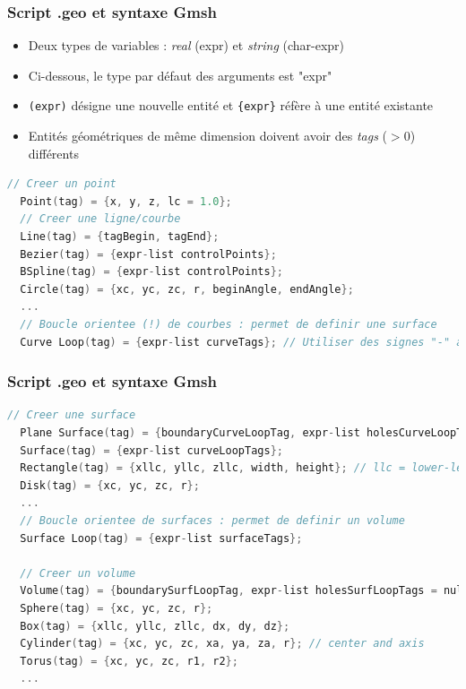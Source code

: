 \documentclass[aspectratio=169]{beamer}
\begin{document}
\begin{frame}[fragile]
\frametitle{Script .geo et syntaxe Gmsh}
\begin{itemize}
  \item Deux types de variables : \textit{real} (expr) et \textit{string} (char-expr)
  \item Ci-dessous, le type par défaut des arguments est "expr"
  \item \texttt{(expr)} désigne une nouvelle entité et \texttt{\{expr\}} réfère à une entité existante
  \item Entités géométriques de même dimension doivent avoir des \textit{tags} ($>0$) différents
\end{itemize}
\begin{lstlisting}[language=c++]
  // Creer un point
  Point(tag) = {x, y, z, lc = 1.0};
  // Creer une ligne/courbe
  Line(tag) = {tagBegin, tagEnd};
  Bezier(tag) = {expr-list controlPoints};
  BSpline(tag) = {expr-list controlPoints};
  Circle(tag) = {xc, yc, zc, r, beginAngle, endAngle};
  ...
  // Boucle orientee (!) de courbes : permet de definir une surface
  Curve Loop(tag) = {expr-list curveTags}; // Utiliser des signes "-" au besoin
\end{lstlisting}
\end{frame}

\begin{frame}[fragile]
\frametitle{Script .geo et syntaxe Gmsh}
\begin{lstlisting}[language=c++]
  // Creer une surface
  Plane Surface(tag) = {boundaryCurveLoopTag, expr-list holesCurveLoopTags = null};
  Surface(tag) = {expr-list curveLoopTags};
  Rectangle(tag) = {xllc, yllc, zllc, width, height}; // llc = lower-left corner
  Disk(tag) = {xc, yc, zc, r};
  ...
  // Boucle orientee de surfaces : permet de definir un volume
  Surface Loop(tag) = {expr-list surfaceTags};

  // Creer un volume
  Volume(tag) = {boundarySurfLoopTag, expr-list holesSurfLoopTags = null};
  Sphere(tag) = {xc, yc, zc, r};
  Box(tag) = {xllc, yllc, zllc, dx, dy, dz};
  Cylinder(tag) = {xc, yc, zc, xa, ya, za, r}; // center and axis
  Torus(tag) = {xc, yc, zc, r1, r2};
  ...
\end{lstlisting}
\end{frame}
\end{document}
